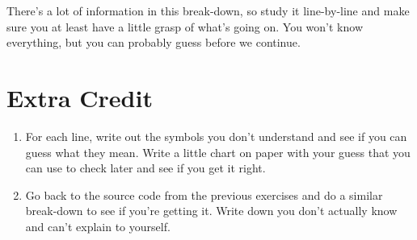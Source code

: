 There's a lot of information in this break-down, so study it line-by-line
and make sure you at least have a little grasp of what's going on.  You
won't know everything, but you can probably guess before we continue.

\section{Extra Credit}

\begin{enumerate}
\item For each line, write out the symbols you don't understand and
    see if you can guess what they mean.  Write a little chart on 
    paper with your guess that you can use to check later and see
    if you get it right.
\item Go back to the source code from the previous exercises and
    do a similar break-down to see if you're getting it.  Write down
    you don't actually know and can't explain to yourself.
\end{enumerate}


